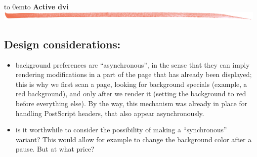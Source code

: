 \documentclass[12pt]{article}
\def\keymenu#1{\textcolor{red}{\underline{#1}}}
\def\advifooter{\vbox to 0em{\vbox to \vsize {\vfill
Press: \keymenu{n}ext page \keymenu{p}revious page
\keymenu{\textvisiblespace} next pause%
\hfill{\embedsticky{advianim}{1.56cm}{1.824cm}{animate -geometry !g! -window !p advilogo.anim.gif}}
} \vss}}
\def\adviheader{\noindent
{\bf\Large Active dvi}\\
\includegraphics[width=\textwidth]{../tex/bar.jpg.eps}}
\let \Newpage \newpage
\def \newpage {\Newpage \advifooter\adviheader}
\def\adviemptyfooter{\vbox to 0em{\vbox to \vsize {\vfill
~~\vss\killembed{advianim}}}}
\def\lastpage{\Newpage\adviemptyfooter\adviheader}
\begin{document}
\lastpage

\subsection* {Design considerations:}
  \begin{itemize}
    \item background preferences are ``asynchronous'', in the sense that they can imply rendering modifications
          in a part of the page that has already been displayed; this is why we first scan a page, looking for
          background specials (example, a red background), and only after we render it (setting the background to red
          before everything else). By the way, this mechanism was already in place for
          handling PostScript headers, that also appear asynchronously.
    \item is it worthwhile to consider the possibility of making a ``synchronous'' variant? This would allow
          for example to change the background color after a pause. But at what price?
  \end{itemize}
\end{document}
